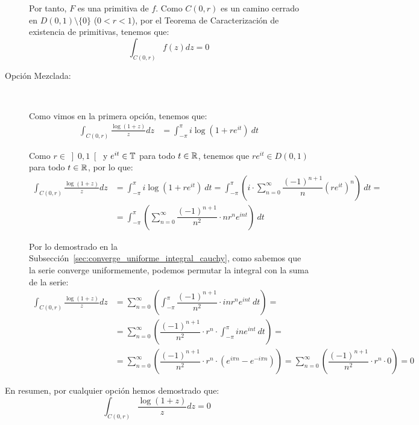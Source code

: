 \begin{ejercicio}
\begin{description}
        Por tanto, $F$ es una primitiva de $f$. Como $C(0,r)$ es un camino cerrado en $D(0,1)\setminus \{0\}$ ($0<r<1$), por el Teorema de Caracterización de existencia de primitivas, tenemos que:
        \begin{equation*}
            \int_{C(0,r)} f(z)dz = 0
        \end{equation*}

        \item[Opción Mezclada:]~
        
        Como vimos en la primera opción, tenemos que:
        \begin{align*}
            \int_{C(0,r)} \frac{\log(1+z)}{z}dz &= \int_{-\pi}^{\pi} i\log(1+re^{it})\ dt
        \end{align*}

        Como $r\in \left]0,1\right[$ y $e^{it} \in \mathbb{T}$ para todo $t \in \mathbb{R}$, tenemos que $re^{it} \in D(0,1)$ para todo $t \in \mathbb{R}$, por lo que:
        \begin{align*}
            \int_{C(0,r)} \frac{\log(1+z)}{z}dz &= \int_{-\pi}^{\pi} i\log(1+re^{it})\ dt = \int_{-\pi}^{\pi} \left(i\cdot\sum\limits_{n=0}^\infty \dfrac{(-1)^{n+1}}{n}(re^{it})^{n}\right)\ dt
            =\\&= \int_{-\pi}^{\pi} \left(\sum\limits_{n=0}^\infty \dfrac{(-1)^{n+1}}{n^2}\cdot nr^ne^{int}\right)\ dt
        \end{align*}

        Por lo demostrado en la Subsección~\ref{sec:converge_uniforme_integral_cauchy}, como sabemos que la serie converge uniformemente, podemos permutar la integral con la suma de la serie:
        \begin{align*}
            \int_{C(0,r)} \frac{\log(1+z)}{z}dz &= \sum\limits_{n=0}^\infty\left(\int_{-\pi}^{\pi} \dfrac{(-1)^{n+1}}{n^2}\cdot inr^ne^{int}\ dt\right)
            =\\&= \sum\limits_{n=0}^\infty\left(\dfrac{(-1)^{n+1}}{n^2}\cdot r^n\cdot \int_{-\pi}^{\pi} ine^{int}\ dt\right)
            =\\&= \sum\limits_{n=0}^\infty\left(\dfrac{(-1)^{n+1}}{n^2}\cdot r^n\cdot \left(e^{i\pi n}-e^{-i\pi n}\right)\right)
            = \sum\limits_{n=0}^\infty\left(\dfrac{(-1)^{n+1}}{n^2}\cdot r^n\cdot 0\right)=0
        \end{align*}

        
    \end{description}

    En resumen, por cualquier opción hemos demostrado que:
    \begin{equation*}
        \int_{C(0,r)} \frac{\log(1+z)}{z}dz = 0
    \end{equation*}


\end{ejercicio}
